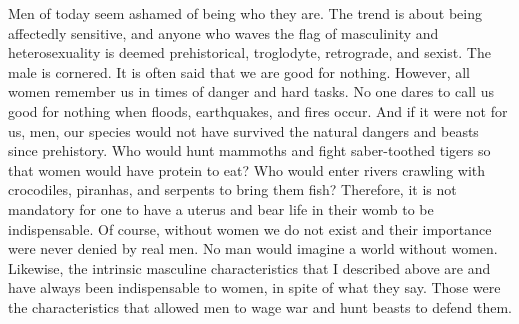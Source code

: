 \par Men of today seem ashamed of being who they are. The trend is about being affectedly sensitive, and anyone who waves the flag of masculinity and heterosexuality is deemed prehistorical, troglodyte, retrograde, and sexist. The male is cornered. It is often said that we are good for nothing. However, all women remember us in times of danger and hard tasks. No one dares to call us good for nothing when floods, earthquakes, and fires occur. And if it were not for us, men, our species would not have survived the natural dangers and beasts since prehistory. Who would hunt mammoths and fight saber-toothed tigers so that women would have protein to eat? Who would enter rivers crawling with crocodiles, piranhas, and serpents to bring them fish? Therefore, it is not mandatory for one to have a uterus and bear life in their womb to be indispensable. Of course, without women we do not exist and their importance were never denied by real men. No man would imagine a world without women. Likewise, the intrinsic masculine characteristics that I described above are and have always been indispensable to women, in spite of what they say. Those were the characteristics that allowed men to wage war and hunt beasts to defend them.